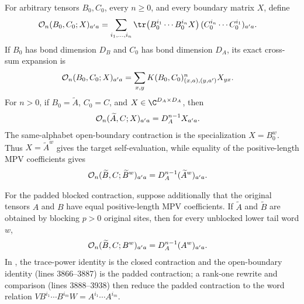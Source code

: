 \begin{lemma}
    For arbitrary tensors $B_0,C_0$, every $n\geq0$, and every boundary matrix
    $X$, define
    \begin{align}
        \mathcal O_n(B_0,C_0;X)_{a'a}
         & =\sum_{i_1,\ldots,i_n}
        \tr\!\left(B_0^{i_1}\cdots B_0^{i_n}X\right)
        (C_0^{i_n}\cdots C_0^{i_1})_{a'a}.
        \notag
    \end{align}
    If $B_0$ has bond dimension $D_B$ and $C_0$ has bond dimension $D_A$,
    its exact cross-sum expansion is
    \begin{align}
        \mathcal O_n(B_0,C_0;X)_{a'a}
         & =\sum_{x,y}K(B_0,C_0)^n_{(x,a),(y,a')}X_{yx}.
        \notag
    \end{align}
    For $n>0$, if $B_0=\widetilde A$, $C_0=C$, and
    $X\in\C^{D_A\times D_A}$, then
    \begin{align}
        \mathcal O_n(\widetilde A,C;X)_{a'a}
         & =D_A^{n-1}X_{a'a}.
        \notag
    \end{align}
    The same-alphabet open-boundary contraction is the specialization
    $X=B_0^w$.  Thus $X=\widetilde A^w$ gives the target self-evaluation, while
    equality of the positive-length MPV coefficients gives
    \begin{align}
        \mathcal O_n(\widetilde B,C;\widetilde B^w)_{a'a}
         & =D_A^{n-1}(\widetilde A^w)_{a'a}.
        \notag
    \end{align}

    For the padded blocked contraction, suppose additionally that the original
    tensors $A$ and $B$ have equal positive-length MPV coefficients.  If
    $\widetilde A$ and $\widetilde B$ are obtained by blocking $p>0$ original
    sites, then for every unblocked lower tail word $w$,
    \begin{align}
        \mathcal O_n(\widetilde B,C;B^w)_{a'a}
         & =D_A^{n-1}(A^w)_{a'a}.
        \notag
    \end{align}
    In \cite[proof of Proposition~20, lines~3839--3865]{Molnar2018SemiInjective},
    the trace-power identity is the closed contraction and the open-boundary
    identity (lines 3866--3887) is the padded contraction; a rank-one rewrite
    and comparison (lines 3888--3938) then reduce the padded contraction to
    the word relation $VB^{i_1}\cdots B^{i_m}W=A^{i_1}\cdots A^{i_m}$.
\end{lemma}

